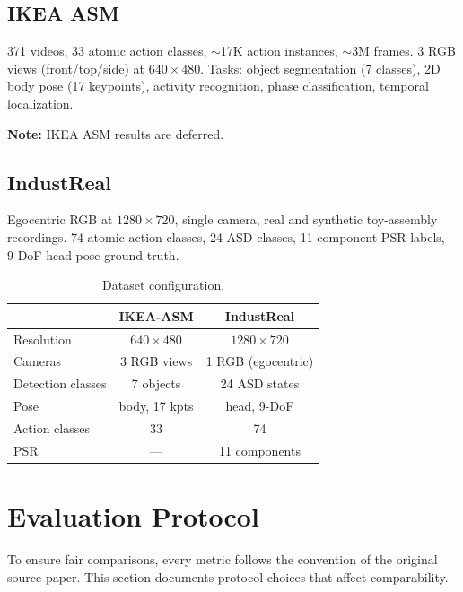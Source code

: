 \documentclass[10pt,journal,compsoc]{IEEEtran}
\newcommand{\ikea}{IKEA-ASM}
\newcommand{\industreal}{IndustReal}
\begin{document}
\subsection{IKEA ASM}

371 videos, 33 atomic action classes, $\sim$17K action instances, $\sim$3M frames. 3 RGB views (front/top/side) at $640\times480$. Tasks: object segmentation (7 classes), 2D body pose (17 keypoints), activity recognition, phase classification, temporal localization.

\textbf{Note:} IKEA ASM results are deferred.

\subsection{IndustReal}

Egocentric RGB at $1280\times720$, single camera, real and synthetic toy-assembly recordings. 74 atomic action classes, 24 ASD classes, 11-component PSR labels, 9-DoF head pose ground truth.

\begin{table}[htbp]
\centering
\small
\caption{Dataset configuration.}
\label{tab:dataset-config}
\begin{tabular}{l c c}
\toprule
 & \ikea{} & \industreal{} \\
\midrule
Resolution & $640\times480$ & $1280\times720$ \\
Cameras & 3 RGB views & 1 RGB (egocentric) \\
Detection classes & 7 objects & 24 ASD states \\
Pose & body, 17 kpts & head, 9-DoF \\
Action classes & 33 & 74 \\
PSR & --- & 11 components \\
\bottomrule
\end{tabular}
\end{table}

\FloatBarrier

\section{Evaluation Protocol}
\label{sec:protocol}

To ensure fair comparisons, every metric follows the convention of the original source paper. This section documents protocol choices that affect comparability.
\end{document}
